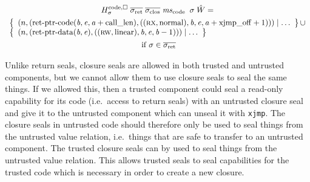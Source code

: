 \documentclass[acmsmall,review,anonymous]{acmart}\settopmatter{printfolios=true,printccs=false,printacmref=false}
\renewcommand{\decInstr}[1]{\plainfun{decode}{#1}}
\begin{document}
\begin{multline*}
  H^\mathrm{code,\square}_\sigma \; \sigrets \; \sigcloss \; \mscode \; \; \sigma \; \hat{W}= \\
  \begin{array}[t]{l}
\left\{
    \begin{array}{l}
      \npair{\left(\retptrc(\baddr,\eaddr,\aaddr+\calllen),((\rx,\normal),\baddr,\eaddr,\aaddr+\mathrm{xjmp\_off}+1)\right)} \mid \dots
    \end{array}
      \right\} \cup \\
\left\{
    \begin{array}{l}
      \npair{(\retptrd(\baddr,\eaddr),((\rw,\linear),\baddr,\eaddr,\baddr-1))} \mid \dots
    \end{array}
    \right\} \\
  \end{array}\\
    \text{ if } \sigma \in \sigrets
\end{multline*}

Unlike return seals, closure seals are allowed in both trusted and untrusted components, but we cannot allow them to use closure seals to seal the same things.
If we allowed this, then a trusted component could seal a read-only capability for its code (i.e.\ access to return seals) with an untrusted closure seal and give it to the untrusted component which can unseal it with \texttt{xjmp}.
The closure seals in untrusted code should therefore only be used to seal things from the untrusted value relation, i.e.\ things that are safe to transfer to an untrusted component.
The trusted closure seals can by used to seal things from the untrusted value relation.
This allows trusted seals to seal capabilities for the trusted code which is necessary in order to create a new closure.
\end{document}
